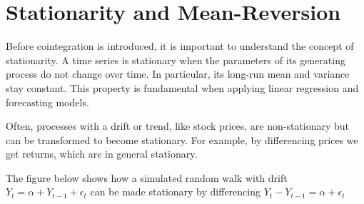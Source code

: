 \documentclass{article}
\begin{document}
    \section{Stationarity and
Mean-Reversion}\label{stationarity-and-mean-reversion}

    Before cointegration is introduced, it is important to understand the
concept of stationarity. A time series is stationary when the parameters
of its generating process do not change over time. In particular, its
long-run mean and variance stay constant. This property is fundamental
when applying linear regression and forecasting models.

Often, processes with a drift or trend, like stock prices, are
non-stationary but can be transformed to become stationary. For example,
by differencing prices we get returns, which are in general stationary.

The figure below shows how a simulated random walk with drift
\(Y_t = \alpha + Y_{t-1} + \epsilon_t\) can be made stationary by
differencing \(Y_t - Y_{t-1} = \alpha + \epsilon_t\)
\end{document}
